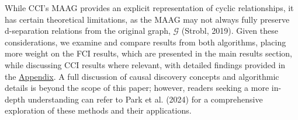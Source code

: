 \documentclass[
]{article}
\begin{document}
While CCI's MAAG provides an explicit representation of cyclic
relationships, it has certain theoretical limitations, as the MAAG may
not always fully preserve d-separation relations from the original
graph, \(\mathcal{G}\) (Strobl, 2019). Given these considerations, we
examine and compare results from both algorithms, placing more weight on
the FCI results, which are presented in the main results section, while
discussing CCI results where relevant, with detailed findings provided
in the \hyperref[sec-appendix]{Appendix}. A full discussion of causal
discovery concepts and algorithmic details is beyond the scope of this
paper; however, readers seeking a more in-depth understanding can refer
to Park et al. (2024) for a comprehensive exploration of these methods
and their applications.

\begin{figure}

\begin{minipage}{0.33\linewidth}



\end{minipage}%
%
\begin{minipage}{0.33\linewidth}

\end{minipage}
\end{figure}
\end{document}
